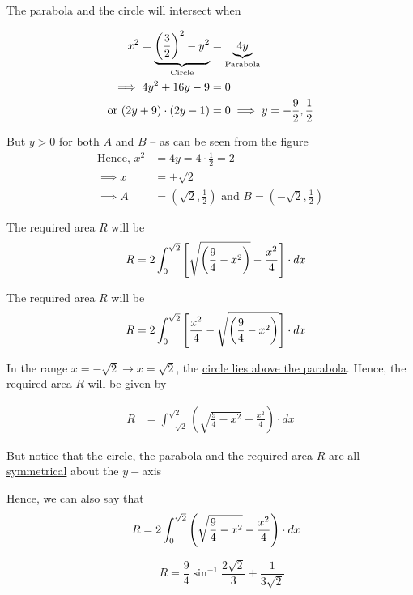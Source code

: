 \documentclass[14pt,fleqn]{extarticle}
\begin{document}
\newcard 

The parabola and the circle will intersect when 

\begin{align}
x^2 = \underbrace{\left(\frac{3}{2} \right)^2 - y^2}_{\text{Circle}} &= \underbrace{4y}_{\text{Parabola}} \\
\implies 4y^2 + 16y - 9 &= 0 \\
\text{or }(2y+9)\cdot (2y-1) &= 0\implies y=-\frac{9}{2},\frac{1}{2}
\end{align}

But \underline{$y > 0$} for both $A$ and $B$ -- as can be seen from the figure 
%
\begin{align}
\text{Hence, }x^2 &= 4y = 4\cdot\frac{1}{2} = 2 \\
\implies x &= \pm\sqrt{2} \\
\implies A &=\left(\sqrt{2},\frac{1}{2} \right) \text{ and }B = \left( -\sqrt{2},\frac{1}{2}\right)
\end{align}


\newcard 

The required area $R$ will be 
\[ \quad R = 2\int_{0}^{\sqrt{2}} \left[\sqrt{\left(\frac{9}{4}-x^2 \right)} - \frac{x^2}{4} \right]\cdot dx \]

\newcard 
The required area $R$ will be 
\[ \quad R = 2\int_{0}^{\sqrt{2}} \left[\frac{x^2}{4} - \sqrt{\left(\frac{9}{4}-x^2 \right)}\right]\cdot dx \]

\newcard 

In the range $x=-\sqrt{2}\rightarrow x=\sqrt{2}$, the 
\underline{circle lies above the parabola}. Hence, the
required area $R$ will be given by 

\begin{align}
R &= \int_{-\sqrt{2}}^{\sqrt{2}}\left( \sqrt{\frac{9}{4}-x^2} - \frac{x^2}{4}\right)\cdot dx
\end{align} 

But notice that the circle, the parabola and the required area $R$ are all \underline{symmetrical} about the $y-$axis\newline 

Hence, we can also say that 
\[ \quad R = 2\int_{0}^{\sqrt{2}} \left( \sqrt{\frac{9}{4}-x^2} - \frac{x^2}{4}\right)\cdot dx \]

\newcard 
\[ \qquad R = \frac{9}{4}\sin^{-1}\frac{2\sqrt{2}}{3} + \frac{1}{3\sqrt{2}} \]

\newcard 
\end{document}
